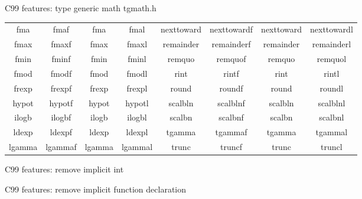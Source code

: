\begin{frame}{C99 features: type generic math tgmath.h}
{\begin{center}
{\begin{tabular}{cccccccc}
                    fma & fmaf & fma & fmal & nexttoward & nexttowardf & nexttoward & nexttowardl \\
                    fmax & fmaxf & fmax & fmaxl & remainder & remainderf & remainder & remainderl \\
                    fmin & fminf & fmin & fminl & remquo & remquof & remquo & remquol \\
                    fmod & fmodf & fmod & fmodl & rint & rintf & rint & rintl \\
                    frexp & frexpf & frexp & frexpl & round & roundf & round & roundl \\
                    hypot & hypotf & hypot & hypotl & scalbln & scalblnf & scalbln & scalblnl \\
                    ilogb & ilogbf & ilogb & ilogbl & scalbn & scalbnf & scalbn & scalbnl \\
                    ldexp & ldexpf & ldexp & ldexpl & tgamma & tgammaf & tgamma & tgammal \\
                    lgamma & lgammaf & lgamma & lgammal & trunc & truncf & trunc & truncl \\
                \end{tabular}
            }
        \end{center}
    }
\end{frame}
\begin{frame}{C99 features: remove implicit int}
\end{frame}
\begin{frame}{C99 features: remove implicit function declaration}
\end{frame}
